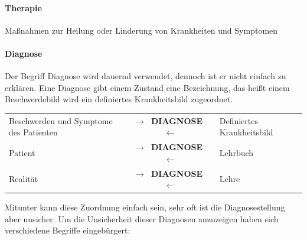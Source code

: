 \paragraph{Therapie}  Ma{\ss}nahmen zur
Heilung oder Linderung von Krankheiten und Symptomen
\paragraph{Diagnose} 

Der Begriff Diagnose wird dauernd verwendet, dennoch ist er
nicht einfach zu erklären. Eine Diagnose gibt einem Zustand
eine Bezeichnung, das heißt einem Beschwerdebild wird ein
definiertes Krankheitsbild zugeordnet.

\begin{tabularx}{\linewidth}{XcX}\toprule
Beschwerden und Symptome des Patienten
&
{\color{darkBlue}\sffamily\bfseries $\rightarrow$~DIAGNOSE~$\leftarrow$}
&
Definiertes Krankheitsbild
\\\addlinespace
Patient
&
{\color{darkBlue}\sffamily\bfseries $\rightarrow$~DIAGNOSE~$\leftarrow$}
&
Lehrbuch
\\\addlinespace
Realität
&
{\color{darkBlue}\sffamily\bfseries $\rightarrow$~DIAGNOSE~$\leftarrow$}
&
Lehre
\\\bottomrule
\end{tabularx}


Mitunter kann diese Zuordnung einfach sein, sehr oft ist die Diagnosestellung
aber unsicher. Um die Unsicherheit dieser Diagnosen
anzuzeigen haben sich verschiedene Begriffe eingebürgert: 

